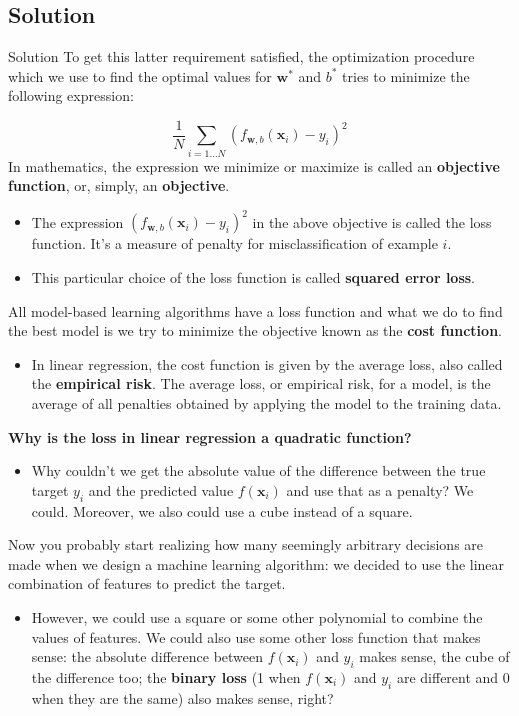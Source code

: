 \documentclass[9pt,dvipsnames]{beamer}
\begin{document}
\subsection{Solution}
\begin{frame}{Solution}
	To get this latter requirement satisfied, the optimization procedure which we use to find the optimal values for $\mathbf{w}^{*}$ and $b^{*}$ tries to minimize the following expression:
	
	$$
	\frac{1}{N} \sum_{i=1 \ldots N}\left(f_{\mathbf{w}, b}\left(\mathbf{x}_{i}\right)-y_{i}\right)^{2}
	$$
	In mathematics, the expression we minimize or maximize is called an \textbf{objective function}, or, simply, an \textbf{objective}. 
	\begin{itemize}
		\item The expression $\left(f_{\mathbf{w}, b}\left(\mathbf{x}_{i}\right)-y_{i}\right)^{2}$ in the above objective is called the loss function. It's a measure of penalty for misclassification of example $i$.
		\item This particular choice of the loss function is called \textbf{squared error loss}.
	\end{itemize}
	
   All model-based learning algorithms have a loss function and what we do to find the best model is we try to minimize the objective known as the \textbf{cost function}. 
   \begin{itemize}
   	\item In linear regression, the cost function is given by the average loss, also called the \textbf{empirical risk}. The average loss, or empirical risk, for a model, is the average of all penalties obtained by applying the model to the training data.
   \end{itemize}
\end{frame}

\begin{frame}
	\textbf{Why is the loss in linear regression a quadratic function?}
	\begin{itemize}
		\item Why couldn't we get the absolute value of the difference between the true target $y_{i}$ and the predicted value $f\left(\mathbf{x}_{i}\right)$ and use that as a penalty? We could. Moreover, we also could use a cube instead of a square.
	\end{itemize}
	Now you probably start realizing how many seemingly arbitrary decisions are made when we design a machine learning algorithm: we decided to use the linear combination of features to predict the target. 
	\begin{itemize}
		\item However, we could use a square or some other polynomial to combine the values of features. We could also use some other loss function that makes sense: the absolute difference between $f\left(\mathbf{x}_{i}\right)$ and $y_{i}$ makes sense, the cube of the difference too;	the \textbf{binary loss} (1 when $f\left(\mathbf{x}_{i}\right)$ and $y_{i}$ are different and 0 when they are the same) also makes sense, right?
	\end{itemize}
	
\end{frame}
\end{document}
